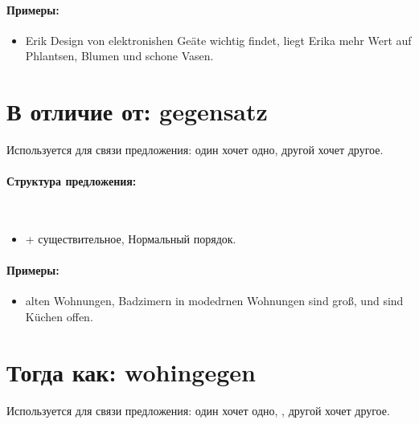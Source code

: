 \paragraph{Примеры:}
\begin{itemize}
    \item {} Erik Design von elektronishen Geäte wichtig findet, liegt Erika mehr Wert auf Phlantsen, Blumen und schone Vasen.
          ~\\ 
\end{itemize}

\section{В отличие от: gegensatz}

Используется для связи предложения:  один хочет одно, другой хочет другое.

\paragraph{Структура предложения:} ~\\
\begin{itemize}
\item {} + существительное, Нормальный порядок.
\end{itemize}

\paragraph{Примеры:}
\begin{itemize}
    \item {} alten Wohnungen, Badzimern in modedrnen Wohnungen sind groß, und sind Küchen offen.
          ~\\ 
\end{itemize}

\section{Тогда как: wohingegen}

Используется для связи предложения: один хочет одно, , другой хочет другое.

